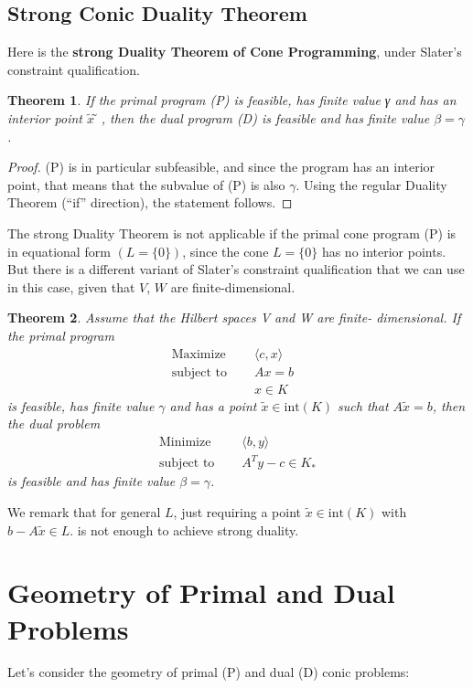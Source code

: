 \documentclass[12pt]{article}
\newtheorem*{theorem}{Theorem}
\begin{document}
    \subsection{Strong Conic Duality Theorem}
  Here is the \textbf{strong Duality Theorem of Cone Programming}, under Slater’s
constraint qualification.
\begin{theorem}
If the primal program (P) is feasible, has finite value γ and has
an interior point $\tilde{x}̃$, then the dual program (D) is feasible and has finite value $\beta = \gamma$.
\end{theorem}

\begin{proof}
(P) is in particular subfeasible, and since the program has an interior
point, that means that the subvalue of (P) is also $\gamma$. Using the regular Duality Theorem (“if” direction), the statement follows.
\end{proof}

The strong Duality Theorem is not applicable if the primal cone program
(P) is in equational form $(L = \{0\})$, since the cone $L = \{0\}$ has no interior points.
But there is a different variant of Slater’s constraint qualification that we can use in this case, given that $V$, $W$ are finite-dimensional.

\begin{theorem}
    Assume that the Hilbert spaces V and W are finite- dimensional. If the primal program
    \begin{align*}
 \text{Maximize } \quad  &\langle c,x \rangle \\
\text{subject to } \quad  &Ax = b &
\tag{P}\\
 &x \in K   			
   	\end{align*}
is feasible, has finite value $\gamma$ and has a point $\tilde{x} \in \mathrm{int} (K)$ such that $A \tilde{x} = b$, then the dual problem 
 \begin{align*}
 \text{Minimize } \quad  &\langle b,y \rangle 
 \tag{D}
 \\
\text{subject to } \quad  &A^Ty - c \in K_* 
   	\end{align*}
   	is feasible and has finite value $\beta = \gamma$.
\end{theorem}
We remark that for general $L$, just requiring a point $\tilde{x} \in \mathrm{int}(K)$ with $b - A \tilde{x} \in L$. is not enough to achieve strong duality. 
    
    \section{Geometry of Primal and Dual Problems}
    Let's consider the geometry of primal (P) and dual (D) conic problems:
    
\end{document}
